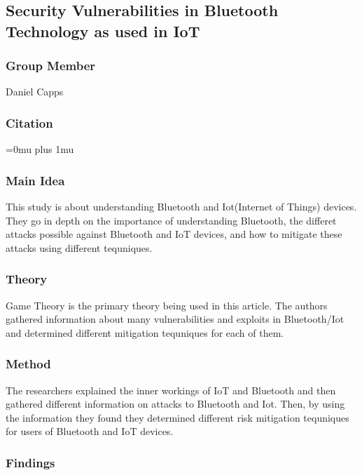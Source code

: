 \noindent
\subsection{Security Vulnerabilities in Bluetooth Technology as used in IoT}

\subsubsection{Group Member}

\noindent
Daniel Capps

\noindent
\subsubsection{Citation}

\Urlmuskip=0mu plus 1mu\relax
{}

\subsubsection{Main Idea}

\noindent
This study is about understanding Bluetooth and Iot(Internet of Things) devices. They go in depth on the importance of understanding Bluetooth, the differet attacks possible against Bluetooth and IoT devices, and how to mitigate these attacks using different tequniques.  

\subsubsection{Theory}

\noindent
Game Theory is the primary theory being used in this article.  The authors gathered information about many vulnerabilities and exploits in Bluetooth/Iot and determined different mitigation tequniques for each of them. 

\subsubsection{Method}

\noindent
The researchers explained the inner workings of IoT and Bluetooth and then gathered different information on attacks to Bluetooth and Iot. Then, by using the information they found they determined different risk mitigation tequniques for users of Bluetooth and IoT devices.

\subsubsection{Findings}

